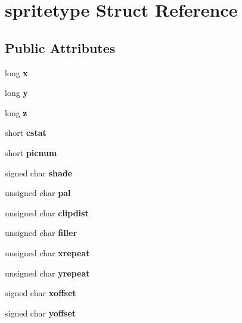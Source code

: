 \section{spritetype Struct Reference}
\label{structspritetype}
\subsection*{Public Attributes}
\begin{DoxyCompactItemize}
\item 
long {\bfseries x}\label{structspritetype_a31c277763bf91534d398fb9afc6629d6}

\item 
long {\bfseries y}\label{structspritetype_a19cf82e3a0ee65fff5695a9dad78b5a9}

\item 
long {\bfseries z}\label{structspritetype_ada60c65193fbe5ac113198b5f55add2a}

\item 
short {\bfseries cstat}\label{structspritetype_a3724dd0d23179bf26097344e4139ca43}

\item 
short {\bfseries picnum}\label{structspritetype_a7345249c77842c1c440b8f5013be5c66}

\item 
signed char {\bfseries shade}\label{structspritetype_a20b5f92d4c1c0fc31b24eb53903d95e6}

\item 
unsigned char {\bfseries pal}\label{structspritetype_ae474b1be8de16895dbc9c2531f2bfa48}

\item 
unsigned char {\bfseries clipdist}\label{structspritetype_afdb79e7ed451c0d10bd6b516de30f6f6}

\item 
unsigned char {\bfseries filler}\label{structspritetype_a5e91cdf48f92912501c4b77617afe8dc}

\item 
unsigned char {\bfseries xrepeat}\label{structspritetype_a622fe6a1221932cb192777f3188cda9e}

\item 
unsigned char {\bfseries yrepeat}\label{structspritetype_a8a7281e8eff2c7b520f63e19ac355434}

\item 
signed char {\bfseries xoffset}\label{structspritetype_a9f410d0480ac4dea2abcefd49d9e77cc}

\item 
signed char {\bfseries yoffset}\label{structspritetype_a80f2c645f751333d2a26c1b35c672d31}


\end{DoxyCompactItemize}
